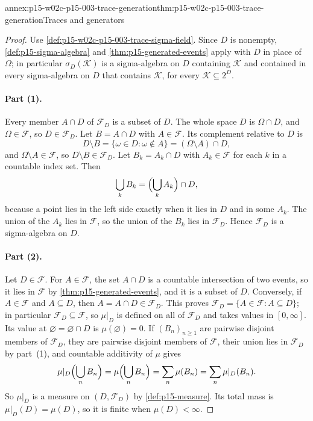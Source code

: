 \begin{annexitem}{annex:p15-w02c-p15-003-trace-generation}{thm:p15-w02c-p15-003-trace-generation}{Traces and generators}
\begin{proof}
Use \cref{def:p15-w02c-p15-003-trace-sigma-field}. Since \(D\) is
nonempty, \cref{def:p15-sigma-algebra} and \cref{thm:p15-generated-events}
apply with \(D\) in place of \(\Omega\); in particular \(\sigma_D(\mathcal K)\)
is a sigma-algebra on \(D\) containing \(\mathcal K\) and contained in every
sigma-algebra on \(D\) that contains \(\mathcal K\), for every
\(\mathcal K\subseteq2^D\).

\paragraph{Part (1).}
Every member \(A\cap D\) of \(\mathcal F_D\) is a subset of \(D\).
The whole space \(D\) is \(\Omega\cap D\), and \(\Omega\in\mathcal F\),
so \(D\in\mathcal F_D\). Let \(B=A\cap D\) with \(A\in\mathcal F\). Its
complement relative to \(D\) is
\[
 D\setminus B=\{\omega\in D:\omega\notin A\}=(\Omega\setminus A)\cap D,
\]
and \(\Omega\setminus A\in\mathcal F\), so \(D\setminus B\in\mathcal F_D\).
Let \(B_k=A_k\cap D\) with \(A_k\in\mathcal F\) for each \(k\) in a
countable index set. Then
\[
 \bigcup_kB_k=\Bigl(\bigcup_kA_k\Bigr)\cap D,
\]
because a point lies in the left side exactly when it lies in \(D\) and in
some \(A_k\). The union of the \(A_k\) lies in \(\mathcal F\), so the
union of the \(B_k\) lies in \(\mathcal F_D\). Hence \(\mathcal F_D\) is
a sigma-algebra on \(D\).

\paragraph{Part (2).}
Let \(D\in\mathcal F\). For \(A\in\mathcal F\), the set \(A\cap D\) is a
countable intersection of two events, so it lies in \(\mathcal F\) by
\cref{thm:p15-generated-events}, and it is a subset of \(D\). Conversely,
if \(A\in\mathcal F\) and \(A\subseteq D\), then \(A=A\cap D\in\mathcal F_D\).
This proves \(\mathcal F_D=\{A\in\mathcal F:A\subseteq D\}\); in
particular \(\mathcal F_D\subseteq\mathcal F\), so \(\mu|_D\) is defined
on all of \(\mathcal F_D\) and takes values in \([0,\infty]\).
Its value at \(\varnothing=\varnothing\cap D\) is \(\mu(\varnothing)=0\).
If \((B_n)_{n\geq1}\) are pairwise disjoint members of \(\mathcal F_D\),
they are pairwise disjoint members of \(\mathcal F\), their union lies in
\(\mathcal F_D\) by part~(1), and countable additivity of \(\mu\) gives
\[
 \mu|_D\Bigl(\bigcup_nB_n\Bigr)=\mu\Bigl(\bigcup_nB_n\Bigr)
       =\sum_n\mu(B_n)=\sum_n\mu|_D(B_n).
\]
So \(\mu|_D\) is a measure on \((D,\mathcal F_D)\) by
\cref{def:p15-measure}. Its total mass is \(\mu|_D(D)=\mu(D)\), so it is
finite when \(\mu(D)<\infty\).


\end{proof}
\end{annexitem}
